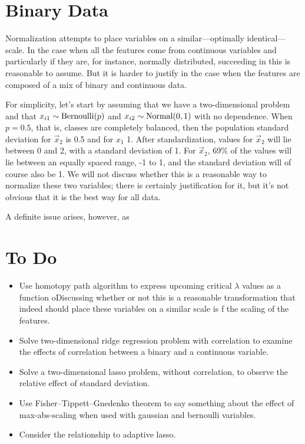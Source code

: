 \section{Binary Data}

Normalization attempts to place variables on a similar---optimally identical---scale. In the case when all the features come from continuous variables and particularly if they are, for instance, normally distributed, succeeding in this is reasonable to assume. But it is harder to justify in the case when the features are composed of a mix of binary and continuous data.

For simplicity, let's start by assuming that we have a two-dimensional problem and that \(x_{i1} \sim \operatorname{Bernoulli}(p)\) and \(x_{i2} \sim \operatorname{Normal}(0, 1)\) with no dependence. When \(p = 0.5\), that is, classes are completely balanced, then the population standard deviation for \(\vec{x}_2\) is 0.5 and for \(x_1\) 1. After standardization, values for \(\vec{x}_2\) will lie between 0 and 2, with a standard deviation of 1. For \(\vec{x}_2\), 69\% of the values will lie between an equally spaced range, -1 to 1, and the standard deviation will of course also be 1. We will not discuss whether this is a reasonable way to normalize these two variables; there is certainly justification for it, but it's not obvious that it is the best way for all data.

A definite issue arises, however, as

\section{To Do}

\begin{itemize}
  \item Use homotopy path algorithm to express upcoming critical \(\lambda\) values as a function oDiscussing whether or not this is a reasonable transformation that indeed should place these variables on a similar scale is f the scaling of the features.
  \item Solve two-dimensional ridge regression problem with correlation to examine the effects of correlation between a binary and a continuous variable.
  \item Solve a two-dimensional lasso problem, without correlation, to observe the relative effect of standard deviation.
  \item Use Fisher–Tippett–Gnedenko theorem to say something about the effect of max-abs-scaling when used with gaussian and bernoulli variables.
  \item Consider the relationship to adaptive lasso.
\end{itemize}

